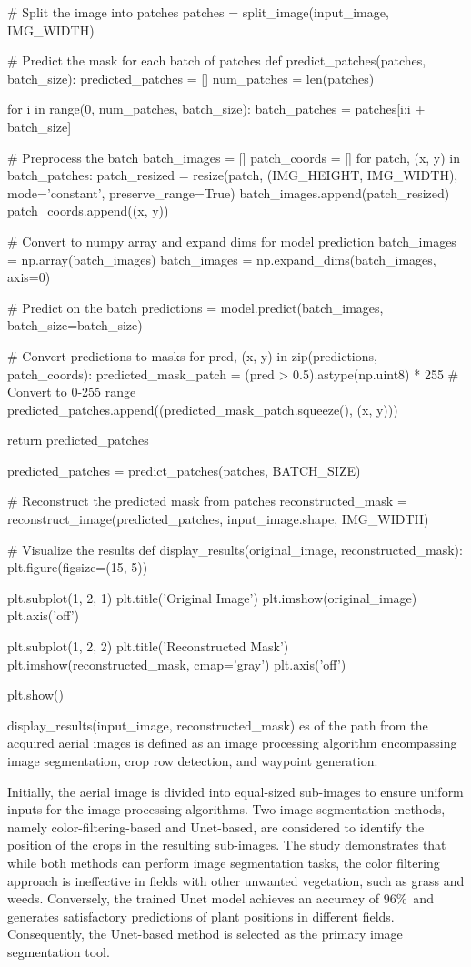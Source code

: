 \documentclass[conference]{IEEEtran}
\begin{document}
# Split the image into patches
patches = split_image(input_image, IMG_WIDTH)

# Predict the mask for each batch of patches
def predict_patches(patches, batch_size):
predicted_patches = []
num_patches = len(patches)

for i in range(0, num_patches, batch_size):
batch_patches = patches[i:i + batch_size]

# Preprocess the batch
batch_images = []
patch_coords = []
for patch, (x, y) in batch_patches:
patch_resized = resize(patch, (IMG_HEIGHT, IMG_WIDTH), mode='constant', preserve_range=True)
batch_images.append(patch_resized)
patch_coords.append((x, y))

# Convert to numpy array and expand dims for model prediction
batch_images = np.array(batch_images)
batch_images = np.expand_dims(batch_images, axis=0)

# Predict on the batch
predictions = model.predict(batch_images, batch_size=batch_size)

# Convert predictions to masks
for pred, (x, y) in zip(predictions, patch_coords):
predicted_mask_patch = (pred > 0.5).astype(np.uint8) * 255  # Convert to 0-255 range
predicted_patches.append((predicted_mask_patch.squeeze(), (x, y)))

return predicted_patches

predicted_patches = predict_patches(patches, BATCH_SIZE)

# Reconstruct the predicted mask from patches
reconstructed_mask = reconstruct_image(predicted_patches, input_image.shape, IMG_WIDTH)

# Visualize the results
def display_results(original_image, reconstructed_mask):
plt.figure(figsize=(15, 5))

plt.subplot(1, 2, 1)
plt.title('Original Image')
plt.imshow(original_image)
plt.axis('off')

plt.subplot(1, 2, 2)
plt.title('Reconstructed Mask')
plt.imshow(reconstructed_mask, cmap='gray')
plt.axis('off')

plt.show()

display_results(input_image, reconstructed_mask)
es of the path from the acquired aerial images is defined as an image processing algorithm encompassing image segmentation, crop row detection, and waypoint generation.

Initially, the aerial image is divided into equal-sized sub-images to ensure uniform inputs for the image processing algorithms. Two image segmentation methods, namely color-filtering-based and Unet-based, are considered to identify the position of the crops in the resulting sub-images. The study demonstrates that while both methods can perform image segmentation tasks, the color filtering approach is ineffective in fields with other unwanted vegetation, such as grass and weeds. Conversely, the trained Unet model achieves an accuracy of 96\%\ and generates satisfactory predictions of plant positions in different fields. Consequently, the Unet-based method is selected as the primary image segmentation tool.
\end{document}
